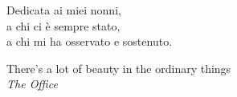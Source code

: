 \cleardoublepage
    \thispagestyle{empty}
            \begin{flushright}
				Dedicata ai miei nonni,\\
				a chi ci è sempre stato,\\
				a chi mi ha osservato e sostenuto.
				\\
				\vspace{2em}

				There's a lot of beauty in the ordinary things\\
				\textit{The Office}

            \end{flushright}
\cleardoublepage